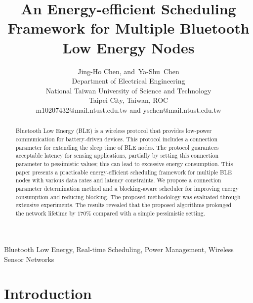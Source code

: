 \documentclass[10pt,journal,compsoc]{IEEEtran}
\begin{document}
\hyphenation{}

\title{An Energy-efficient Scheduling Framework for Multiple Bluetooth Low Energy Nodes}
\author{Jing-Ho Chen, and~Ya-Shu~Chen \\
        Department of Electrical Engineering\\
        National Taiwan University of Science and Technology\\
        Taipei City, Taiwan, ROC\\
        m10207432@mail.ntust.edu.tw and yschen@mail.ntust.edu.tw}

\maketitle
{\begin{abstract}
Bluetooth Low Energy (BLE) is a wireless protocol that provides low-power communication for battery-driven devices. This protocol includes a connection parameter for extending the sleep time of BLE nodes. The protocol guarantees acceptable latency for sensing applications, partially by setting this connection parameter to pessimistic values; this can lead to excessive energy consumption. This paper presents a practicable energy-efficient scheduling framework for multiple BLE nodes with various data rates and latency constraints. We propose a connection parameter determination method and a blocking-aware scheduler for improving energy consumption and reducing blocking. The proposed methodology was evaluated through extensive experiments. The results revealed that the proposed algorithms prolonged the network lifetime by $170\%$ compared with a simple pessimistic setting.

\end{abstract}

\begin{IEEEkeywords}
Bluetooth Low Energy, Real-time Scheduling, Power Management, Wireless Sensor Networks
\end{IEEEkeywords}

}

\section{Introduction}~\label{sec:introduction}
\end{document}

